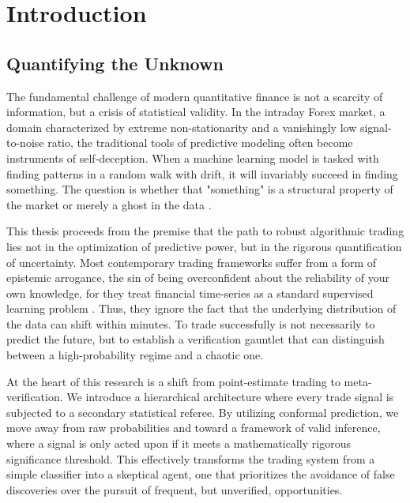 \documentclass[12pt, a4paper]{article}
\begin{document}
\pagebreak

\tableofcontents

\pagebreak

\listoffigures

\pagebreak

\listoftables

\pagebreak

\setcounter{page}{1}

\section{Introduction}
\subsection{Quantifying the Unknown}

The fundamental challenge of modern quantitative finance is not a scarcity of information, but a crisis of statistical validity.
In the intraday Forex market, a domain characterized by extreme non-stationarity and a vanishingly low
signal-to-noise ratio, the traditional tools of predictive modeling often become instruments of self-deception.
When a machine learning model is tasked with finding patterns in a random walk with drift, it will invariably succeed in
finding something. The question is whether that "something" is a structural property of the market or merely a ghost in the data \parencite{xu2026causal}.

\medskip

This thesis proceeds from the premise that the path to robust algorithmic trading lies not in the optimization of predictive power,
but in the rigorous quantification of uncertainty. Most contemporary trading frameworks suffer from
a form of epistemic arrogance, the sin of being overconfident about the reliability of your own knowledge,
for they treat financial time-series as a standard supervised learning problem \parencite{ouma2025epistemic}.
Thus, they ignore the fact that the underlying distribution of the data can shift within minutes.
To trade successfully is not necessarily to predict the future, but to establish a verification gauntlet
that can distinguish between a high-probability regime and a chaotic one.

\medskip

At the heart of this research is a shift from point-estimate trading to meta-verification.
We introduce a hierarchical architecture where every trade signal is subjected to a secondary statistical referee.
By utilizing conformal prediction, we move away from raw probabilities and toward a framework of valid inference,
where a signal is only acted upon if it meets a mathematically rigorous significance threshold.
This effectively transforms the trading system from a simple classifier into a skeptical agent, 
one that prioritizes the avoidance of false discoveries over the pursuit of frequent, but unverified, opportunities.
\end{document}
